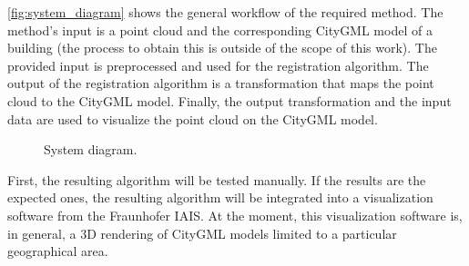         \autoref{fig:system_diagram} shows the general workflow of the required method.
        The method’s input is a point cloud and the corresponding CityGML model of a building  
        (the process to obtain this is outside of the scope of this work).
        The provided input is preprocessed and used for the registration algorithm.
        The output of the registration algorithm is a transformation that maps the point cloud to the CityGML model.
        Finally, the output transformation and the input data are used to visualize the point cloud on the CityGML model.

        \begin{figure}[htp]
            \centering
            
            \caption{System diagram.}
            \label{fig:system_diagram}
        \end{figure}

        First, the resulting algorithm will be tested manually. 
        If the results are the expected ones, the resulting algorithm will be integrated into a visualization software from the Fraunhofer IAIS. 
        At the moment, this visualization software is, in general, a 3D rendering of CityGML models limited to a particular geographical area.



